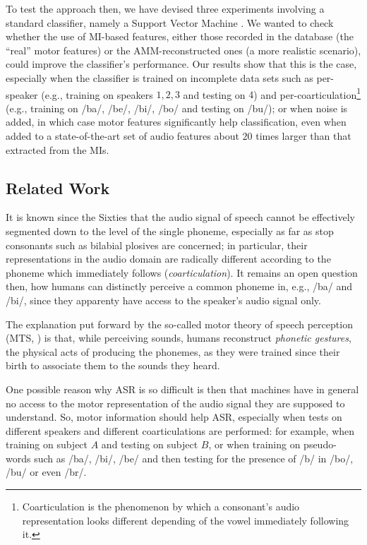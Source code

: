To test the approach then, we have devised three experiments involving a standard
classifier, namely a Support Vector Machine \cite{BGV92}. We wanted to check whether
the use of MI-based features, either those recorded in the database (the ``real''
motor features) or the AMM-reconstructed ones (a more realistic scenario),
could improve the classifier's performance. Our results show that this is the case,
especially when the classifier is trained on incomplete data sets such as 
per-speaker (e.g., training on speakers $1,2,3$ and testing on $4$) and
per-coarticulation\footnote{Coarticulation is the phenomenon by which a consonant's audio representation
looks different depending of the vowel immediately following it.}
(e.g., training on /ba/, /be/, /bi/, /bo/ and testing on /bu/); or when noise is added,
in which case motor features significantly help classification, even when added to a
state-of-the-art set of audio features about $20$ times larger than that extracted
from the MIs.

\subsection{Related Work}

It is known since the Sixties \cite{liberman1} that the audio signal of speech
cannot be effectively segmented down to the level of the single phoneme,
especially as far as stop consonants such as bilabial plosives
are concerned; in particular, their representations in the audio domain are
radically different according to the phoneme which immediately follows
(\emph{coarticulation}). It remains an open question then, how humans can
distinctly perceive a common phoneme in, e.g., /ba/ and /bi/, since they
apparenty have access to the speaker's audio signal only.

The explanation put forward by the so-called motor theory of speech perception
(MTS, \cite{liberman2,galant,massaro}) is that, while perceiving sounds,
humans reconstruct \emph{phonetic gestures}, the physical acts of
producing the phonemes, as they were trained since their birth to associate
them to the sounds they heard. 

One possible reason why ASR is so difficult is then that
machines have in general no access to the motor representation of the
audio signal they are supposed to understand. So, motor information should
help ASR, especially when tests on different speakers and different
coarticulations are performed: for example, when training on subject $A$ and
testing on subject $B$, or when training on pseudo-words such as /ba/, /bi/,
/be/ and then testing for the presence of /b/ in /bo/, /bu/ or even /br/.

